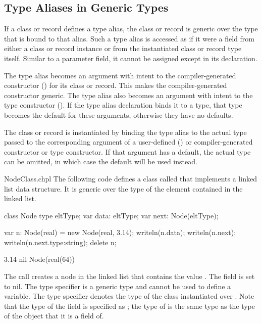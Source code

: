\subsection{Type Aliases in Generic Types}
\label{Type_Aliases_in_Generic_Types}

If a class or record defines a type alias, the class or record
is generic over the type that is bound to that alias.
Such a type alias is accessed as if it were a field from either a class
or record instance or from the instantiated class or record type itself.
Similar to a parameter field, it cannot be assigned
except in its declaration.

The type alias becomes an argument with intent  to
the compiler-generated constructor ()
for its class or record. This makes the compiler-generated constructor generic.
The type alias also becomes an argument with intent  to
the type constructor ().
If the type alias declaration binds it to a type, that type
becomes the default for these arguments, otherwise they have no defaults.

The class or record is instantiated by binding the type alias
to the actual type passed to the corresponding argument of
a user-defined ()
or compiler-generated constructor or type constructor.
If that argument has a default, the actual type can be omitted, in
which case the default will be used instead.

\begin{chapelexample}{NodeClass.chpl}
The following code defines a class called  that implements
a linked list data structure.  It is generic over the type of the
element contained in the linked list.
\begin{chapel}
class Node {
  type eltType;
  var data: eltType;
  var next: Node(eltType);
}
\end{chapel}
\begin{chapelpost}
var n: Node(real) = new Node(real, 3.14);
writeln(n.data);
writeln(n.next);
writeln(n.next.type:string);
delete n;
\end{chapelpost}
\begin{chapeloutput}
3.14
nil
Node(real(64))
\end{chapeloutput}
The call  creates a node in the linked list
that contains the value .  The  field is set to
nil.  The type specifier  is a generic type and cannot be
used to define a variable.  The type specifier 
denotes the type of the  class instantiated over
.  Note that the type of the  field is specified
as ; the type of  is the same type as
the type of the object that it is a field of.
\end{chapelexample}

